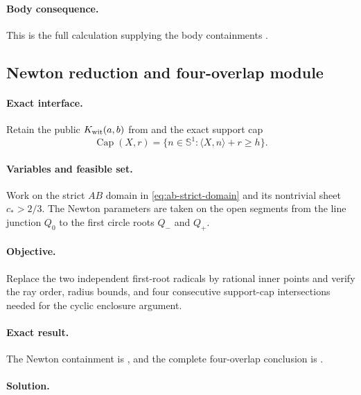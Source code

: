 \paragraph{Body consequence.}
This is the full calculation supplying the body containments
.

\subsection{Newton reduction and four-overlap module}

\paragraph{Exact interface.}
Retain the public $K_{\rm wit}(a,b)$ from
 and the exact support cap
\[
 \operatorname{Cap}(X,r)
 =\{n\in\mathbb S^1:\langle X,n\rangle+r\ge h\}.
\]

\paragraph{Variables and feasible set.}
Work on the strict $AB$ domain in \eqref{eq:ab-strict-domain} and its
nontrivial sheet $c_*>2/3$.  The Newton parameters are taken on the open
segments from the line junction $Q_0$ to the first circle roots $Q_-$ and
$Q_+$.

\paragraph{Objective.}
Replace the two independent first-root radicals by rational inner points and
verify the ray order, radius bounds, and four consecutive support-cap
intersections needed for the cyclic enclosure argument.

\paragraph{Exact result.}
The Newton containment is
, and the
complete four-overlap conclusion is
.

\paragraph{Solution.}

